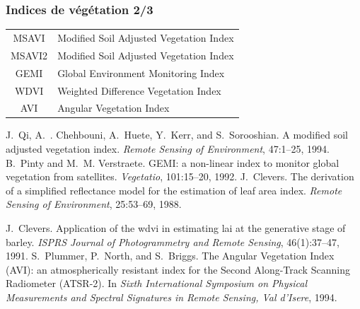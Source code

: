 \documentclass[compress]{beamer}
\begin{document}
\begin{frame}
\frametitle{Indices de végétation 2/3}
\footnotesize \centering
\begin{tabular}{|c|l|}
\hline
MSAVI & Modified Soil Adjusted Vegetation Index  \cite{Qi1994-MSAVI} \\
MSAVI2 & Modified Soil Adjusted Vegetation Index  \cite{Qi1994-MSAVI} \\
GEMI &   Global Environment Monitoring Index \cite{Pinty1992-GEMI} \\
WDVI & Weighted Difference Vegetation Index  \cite{Clevers1988-WDVI,Clevers1991-WDVI} \\ 
AVI & Angular Vegetation Index  \cite{AVI}\\
\hline
\end{tabular}
\begin{thebibliography}{noidea}
\tiny
{}
J.~Qi, A.~. Chehbouni, A.~Huete, Y.~Kerr, and S.~Sorooshian.
 A modified soil adjusted vegetation index.
 {\em Remote Sensing of Environment}, 47:1--25, 1994.
B.~Pinty and M.~M. Verstraete.
 {GEMI}: a non-linear index to monitor global vegetation from
  satellites.
 {\em Vegetatio}, 101:15--20, 1992.
J.~Clevers.
 The derivation of a simplified reflectance model for the estimation
  of leaf area index.
 {\em Remote Sensing of Environment}, 25:53--69, 1988.

J.~Clevers.
 Application of the wdvi in estimating lai at the generative stage of
  barley.
 {\em ISPRS Journal of Photogrammetry and Remote Sensing},
  46(1):37--47, 1991.
S.~Plummer, P.~North, and S.~Briggs.
 {The Angular Vegetation Index (AVI): an atmospherically resistant
  index for the Second Along-Track Scanning Radiometer (ATSR-2)}.
 In {\em Sixth International Symposium on Physical Measurements and
  Spectral Signatures in Remote Sensing, Val d'Isere}, 1994.
\end{thebibliography}
\end{frame}
\end{document}
